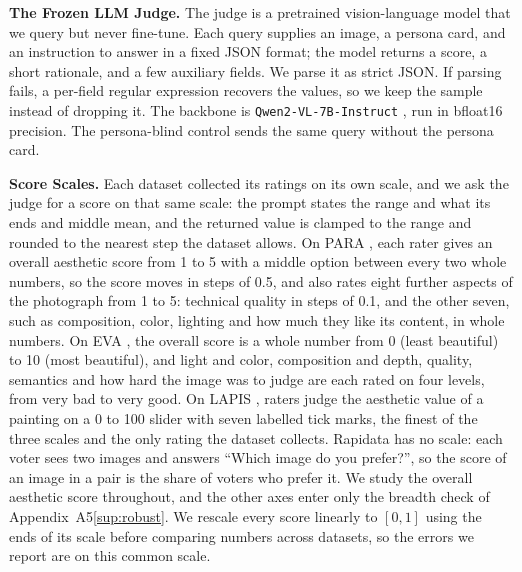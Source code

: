 \documentclass[runningheads]{llncs}
\newcommand{\appref}[2]{\ifdefined\mainonly #2\else\ref{#1}\fi}
\begin{document}
\textbf{The Frozen LLM Judge.} The judge is a pretrained vision-language model that we query but never fine-tune. Each query supplies an image, a persona card, and an instruction to answer in a fixed JSON format; the model returns a score, a short rationale, and a few auxiliary fields. We parse it as strict JSON. If parsing fails, a per-field regular expression recovers the values, so we keep the sample instead of dropping it.  The backbone is \texttt{Qwen2-VL-7B-Instruct} \cite{wang2024qwen2vl}, run in bfloat16 precision. The persona-blind control sends the same query without the persona card.

\textbf{Score Scales.} Each dataset collected its ratings on its own scale, and we ask the judge for a score on that same scale: the prompt states the range and what its ends and middle mean, and the returned value is clamped to the range and rounded to the nearest step the dataset allows. On PARA \cite{yang2022para}, each rater gives an overall aesthetic score from 1 to 5 with a middle option between every two whole numbers, so the score moves in steps of 0.5, and also rates eight further aspects of the photograph from 1 to 5: technical quality in steps of 0.1, and the other seven, such as composition, color, lighting and how much they like its content, in whole numbers. On EVA \cite{kang2020eva}, the overall score is a whole number from 0 (least beautiful) to 10 (most beautiful), and light and color, composition and depth, quality, semantics and how hard the image was to judge are each rated on four levels, from very bad to very good. On LAPIS \cite{maerten2025lapis}, raters judge the aesthetic value of a painting on a 0 to 100 slider with seven labelled tick marks, the finest of the three scales and the only rating the dataset collects. Rapidata \cite{rapidata2024} has no scale: each voter sees two images and answers ``Which image do you prefer?'', so the score of an image in a pair is the share of voters who prefer it. We study the overall aesthetic score throughout, and the other axes enter only the breadth check of Appendix~\appref{sup:robust}{A5}. We rescale every score linearly to $[0,1]$ using the ends of its scale before comparing numbers across datasets, so the errors we report are on this common scale.
\end{document}
